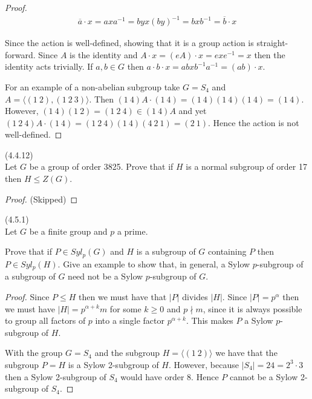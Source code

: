 \documentclass{exam}
\begin{document}
\begin{questions}
\begin{proof}
  \begin{align*}
    \overline a \cdot x = axa^{-1} = byx(by)^{-1} = bxb^{-1}=\overline b\cdot x
  \end{align*}

  Since the action is well-defined, showing that it is a group action is straight-forward.  Since $A$ is the identity and $A\cdot x = (eA)\cdot x = exe^{-1}=x$ then the identity acts trivially.  If $a,b\in G$ then $a\cdot b\cdot x = abxb^{-1}a^{-1} = (ab)\cdot x$.

  \vspace{1cm}

  For an example of a non-abelian subgroup take $G=S_4$ and $A=\langle(1\ 2), (1\ 2\ 3)\rangle$.  Then $(1\ 4)A\cdot (1\ 4) = (1\ 4)(1\ 4)(1\ 4) = (1\ 4)$.  However, $(1\ 4)(1\ 2)=(1\ 2\ 4)\in (1\ 4)A$ and yet $(1\ 2\ 4)A \cdot (1\ 4) = (1\ 2\ 4)(1\ 4)(4\ 2\ 1) = (2\ 1)$.  Hence the action is not well-defined.
\end{proof}

\question(4.4.12)\\
Let $G$ be a group of order 3825.  Prove that if $H$ is a normal subgroup of order 17 then $H\leq Z(G)$.

\begin{proof}
  (Skipped)
\end{proof}

\question(4.5.1)\\
Let $G$ be a finite group and $p$ a prime.

Prove that if $P\in Syl_p(G)$ and $H$ is a subgroup of $G$ containing $P$ then $P\in Syl_p(H)$.  Give an example to show that, in general, a Sylow $p$-subgroup of a subgroup of $G$ need not be a Sylow $p$-subgroup of $G$.

\begin{proof}
  Since $P\leq H$ then we must have that $|P|$ divides $|H|$.  Since $|P|=p^\alpha$ then we must have $|H|=p^{\alpha+k}m$ for some $k\geq 0$ and $p\nmid m$, since it is always possible to group all factors of $p$ into a single factor $p^{\alpha+k}$.  This makes $P$ a Sylow $p$-subgroup of $H$.

  \vspace{1cm}

  With the group $G=S_4$ and the subgroup $H=\langle (1\ 2)\rangle$ we have that the subgroup $P=H$ is a Sylow 2-subgroup of $H$.  However, because $|S_4|=24=2^3\cdot 3$ then a Sylow 2-subgroup of $S_4$ would have order 8.  Hence $P$ cannot be a Sylow 2-subgroup of $S_4$.
\end{proof}


\end{questions}
\end{document}
